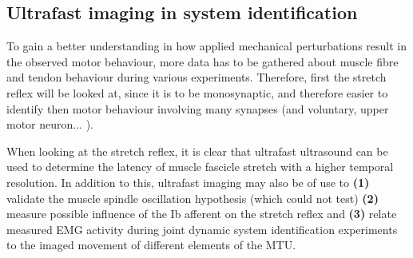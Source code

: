 


\subsection{Ultrafast imaging in system identification}
\label{sec:ufus_disc_sys_id}

\tred[draft:] To gain a better understanding in how applied mechanical perturbations result in the observed motor behaviour, more data has to be gathered about muscle fibre and tendon behaviour during various experiments. Therefore, first the stretch reflex will be looked at, since it is \tred[thought] to be monosynaptic, and therefore easier to identify then motor behaviour involving many synapses (and voluntary, upper motor neuron... ). 

When looking at the stretch reflex, it is clear that ultrafast ultrasound can be used to determine the latency of muscle fascicle stretch with a higher temporal resolution. In addition to this, ultrafast imaging may also be of use to \textbf{(1)} validate the muscle spindle oscillation hypothesis (which \citeauthor{cronin_triceps_2015} could not test) \textbf{(2)} measure possible influence of the Ib afferent on the stretch reflex and \textbf{(3)} relate measured EMG activity during joint dynamic system identification experiments to the imaged movement of different elements of the MTU. 



